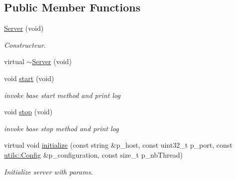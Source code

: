 \subsection*{Public Member Functions}
\begin{DoxyCompactItemize}
\item 
\hyperlink{classxtd_1_1network_1_1bip_1_1Server_ab4c6f8f28b5d56b69c575a6dc1be30b4}{Server} (void)
\begin{DoxyCompactList}\small\item\em Constructeur. \end{DoxyCompactList}\item 
virtual \hyperlink{classxtd_1_1network_1_1bip_1_1Server_a9731cfd5eda9f51604b9b0195acfb208}{$\sim$\+Server} (void)
\item 
void \hyperlink{classxtd_1_1network_1_1bip_1_1Server_aaa19f560d98c05518caa68bf94c36b91}{start} (void)
\begin{DoxyCompactList}\small\item\em invoke base start method and print log \end{DoxyCompactList}\item 
void \hyperlink{classxtd_1_1network_1_1bip_1_1Server_a12041b5218057930724c15e83c478c50}{stop} (void)
\begin{DoxyCompactList}\small\item\em invoke base stop method and print log \end{DoxyCompactList}\item 
virtual void \hyperlink{classxtd_1_1network_1_1bip_1_1Server_a3ba1e98abbe7516f5ec02b2ac9031e3c}{initialize} (const string \&p\+\_\+host, const uint32\+\_\+t p\+\_\+port, const \hyperlink{classxtd_1_1network_1_1utils_1_1Config}{utils\+::\+Config} \&p\+\_\+configuration, const size\+\_\+t p\+\_\+nb\+Thread)
\begin{DoxyCompactList}\small\item\em Initialize server with params. \end{DoxyCompactList}\end{DoxyCompactItemize}
